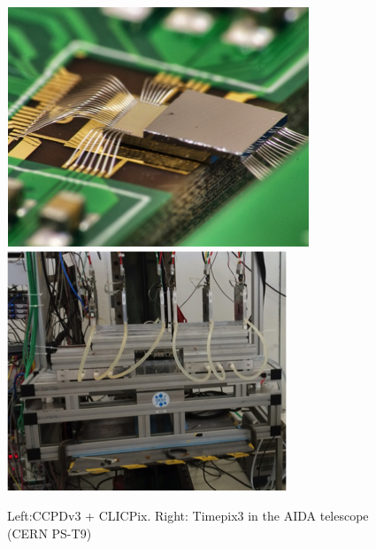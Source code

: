 \begin{figure}
    \centering
    \includegraphics[width=.4\textwidth]{VertexDetector/CLICPix/ccpdv3_clicpix.png}
    \includegraphics[width=.4\textwidth]{VertexDetector/CLICPix/timepix3_telescope.png}
    \caption{Left:CCPDv3 + CLICPix. Right: Timepix3 in the AIDA telescope (CERN PS-T9)}
    \label{fig:VertexDetector:clicpix}
\end{figure}
